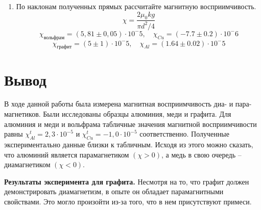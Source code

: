 \documentclass[12pt,a4paper]{article}
\begin{document}
\begin{enumerate}
\begin{figure}[h!]
\begin{center}
			\label{fig:facility}
		\end{center}
	\end{figure}
	\item По наклонам полученных прямых рассчитайте магнитную восприимчивость. 
	\[
	\chi = \frac{2 \mu_0 k g}{\pi d^2 /4}
	\]
	\begin{equation}
		\chi_{\text{вольфрам}} = (5,81 \pm 0,05) \cdot 10^-5, \quad \chi_{Cu} = (-7.7 \pm 0.2) \cdot 10^-6
	\end{equation}
	\begin{equation}
		\chi_{\text{графит}} = (5 \pm 1) \cdot 10^-5, \quad \chi_{Al} = (1.64 \pm 0.02) \cdot 10^-5
	\end{equation}
\end{enumerate}
\section{Вывод}
В ходе данной работы была измерена магнитная восприимчивость диа- и пара- магнетиков. Были исследованы образцы алюминия, меди и графита. Для алюминия и меди и вольфрама табличные значения магнитной восприимчивости равны $ \chi_{Al}^t = 2,3 \cdot 10^{-5} $ и $ \chi_{Cu}^t = -1,0 \cdot 10^{-5}$ соответственно. Полученные экспериментально данные близки к табличным. Исходя из этого можно сказать, что алюминий является парамагнетиком $ (\chi > 0) $, а медь в свою очередь -- диамагнетиком $ (\chi < 0) $.


\textbf{Результаты эксперимента для графита.} Несмотря на то, что графит должен демонстрировать диамагнетизм, в опыте он обладает парамагнитными свойствами. Это могло произойти из-за того, что в нем присутствуют примеси. 
\end{document}
